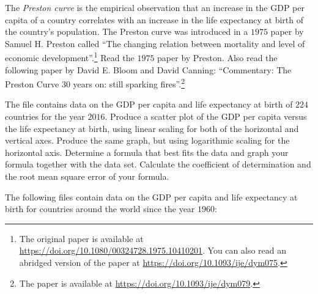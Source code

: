 \documentclass[a4paper,oneside,12pt]{article}
\begin{document}
\begin{problem}
\begin{packedenum}
  \item\label{subprob:logarithm:Preston_curve_reading}
    The \emph{Preston curve} is the empirical observation that an
    increase in the GDP per capita of a country correlates with an
    increase in the life expectancy at birth of the country's
    population.  The Preston curve was introduced in a $1975$ paper by
    Samuel H. Preston called ``The changing relation between
      mortality and level of economic development''.\footnote{
      The original paper is available at
      \url{https://doi.org/10.1080/00324728.1975.10410201}.
      You can also read an abridged version of the paper at
      \url{https://doi.org/10.1093/ije/dym075}.
    }
    Read the $1975$ paper by Preston.  Also read the following paper
    by David E. Bloom and David Canning: ``Commentary: The Preston
    Curve 30 years on: still sparking fires''.\footnote{
      The paper is available at
      \url{https://doi.org/10.1093/ije/dym079}.
    }

  \item\label{subprob:logarithm:Preston_curve_2016_graph_formula}
    The file  contains data on the
    GDP per capita and life expectancy at birth of $224$ countries for
    the year $2016$.  Produce a scatter plot of the GDP per capita
    versus the life expectancy at birth, using linear scaling for both
    of the horizontal and vertical axes.  Produce the same graph, but
    using logarithmic scaling for the horizontal axis.  Determine a
    formula that best fits the data and graph your formula together
    with the data set.  Calculate the coefficient of determination and
    the root mean square error of your formula.

  \item\label{subprob:logarithm:Preston_curve_1960_2016}
    The following files contain data on the GDP per capita and life
    expectancy at birth for countries around the world since the year
    $1960$:
    \begin{packeditem}
    \item {}

    \item {}

    \item {}

    \item {}

    \item {}


\end{packeditem}
\end{packedenum}
\end{problem}
\end{document}
